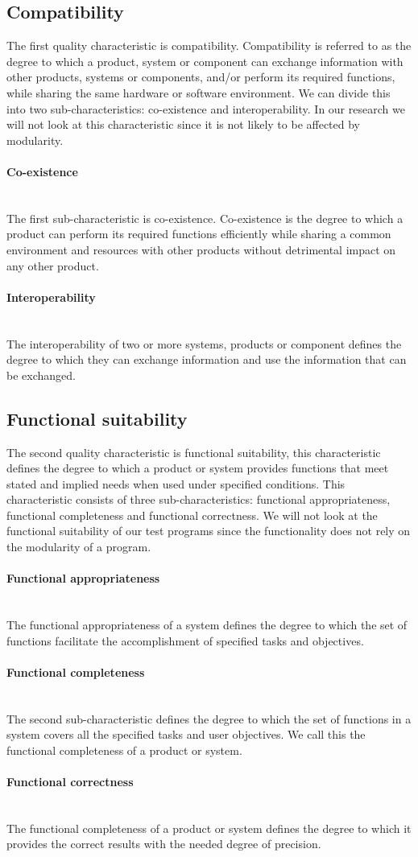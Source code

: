 \documentclass[twoside]{uva-inf-bachelor-thesis}
\newcommand{\myparagraph}[1]{\paragraph{#1}\mbox{}\\}
\begin{document}
\subsection{Compatibility}
The first quality characteristic is compatibility. Compatibility is referred to as the degree to which a product, system or component can exchange information with other products, systems or components, and/or perform its required functions, while sharing the same hardware or software environment. We can divide this into two sub-characteristics: co-existence and interoperability. In our research we will not look at this characteristic since it is not likely to be affected by modularity.

\myparagraph{Co-existence}
The first sub-characteristic is co-existence. Co-existence is the degree to which a product can perform its required functions efficiently while sharing a common environment and resources with other products without detrimental impact on any other product.

\myparagraph{Interoperability}
The interoperability of two or more systems, products or component defines the degree to which they can exchange information and use the information that can be exchanged.

\subsection{Functional suitability}
The second quality characteristic is functional suitability, this characteristic defines the degree to which a product or system provides functions that meet stated and implied needs when used under specified conditions. This characteristic consists of three sub-characteristics: functional appropriateness, functional completeness and functional correctness. We will not look at the functional suitability of our test programs since the functionality does not rely on the modularity of a program.

\myparagraph{Functional appropriateness}
The functional appropriateness of a system defines the degree to which the set of functions facilitate the accomplishment of specified tasks and objectives.

\myparagraph{Functional completeness}
The second sub-characteristic defines the degree to which the set of functions in a system covers all the specified tasks and user objectives. We call this the functional completeness of a product or system.

\myparagraph{Functional correctness}
The functional completeness of a product or system defines the degree to which it provides the correct results with the needed degree of precision.
\end{document}

